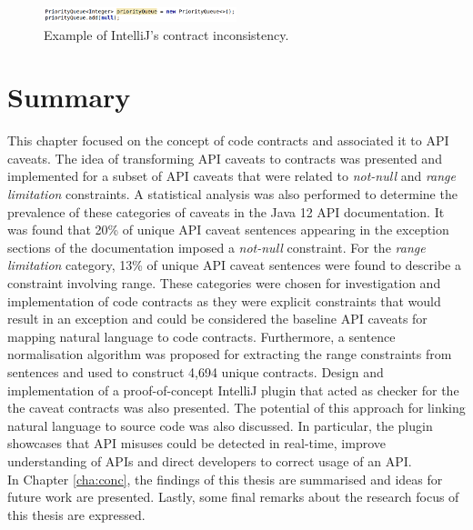 \begin{figure}
	\label{fig:intellij-inspection-off}
	\centering
	\includegraphics[width=0.5\textwidth]{figs/intellij-inspection-off.png}
	\caption{Example of IntelliJ's contract inconsistency.}
\end{figure}

\section{Summary}
\label{sec:contract-summary}
This chapter focused on the concept of code contracts and associated it to API caveats. The idea of transforming API caveats to contracts was presented and implemented for a subset of API caveats that were related to \textit{not-null} and \textit{range limitation} constraints. A statistical analysis was also performed to determine the prevalence of these categories of caveats in the Java 12 API documentation. It was found that 20\% of unique API caveat sentences appearing in the exception sections of the documentation imposed a \textit{not-null} constraint. For the \textit{range limitation} category, 13\% of unique API caveat sentences were found to describe a constraint involving range. These categories were chosen for investigation and implementation of code contracts as they were explicit constraints that would result in an exception and could be considered the baseline API caveats for mapping natural language to code contracts. Furthermore, a sentence normalisation algorithm was proposed for extracting the range constraints from sentences and used to construct 4,694 unique contracts. Design and implementation of a proof-of-concept IntelliJ plugin that acted as checker for the the caveat contracts was also presented. The potential of this approach for linking natural language to source code was also discussed. In particular, the plugin showcases that API misuses could be detected in real-time, improve understanding of APIs and direct developers to correct usage of an API.\\
In Chapter \ref{cha:conc}, the findings of this thesis are summarised and ideas for future work are presented. Lastly, some final remarks about the research focus of this thesis are expressed.
